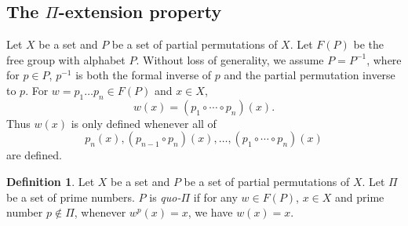 \documentclass[10pt,a4paper]{amsart}
\newtheorem{remark}[theorem]{Remark}
\theoremstyle{definition}
\newtheorem{definition}[theorem]{Definition}
\theoremstyle{definition}
\numberwithin{equation}{section}
\DeclareMathOperator{\Aut}{Aut}
\DeclareMathOperator{\Ker}{ker}
\begin{document}

\subsection{The $\Pi$-extension property}

Let $X$ be a set and $P$ be a set of partial permutations of $X$. Let $F(P)$ be the free group with alphabet $P$. Without loss of generality, we assume $P=P^{-1}$, where for $p\in P$, $p^{-1}$ is both the formal inverse of $p$ and the partial permutation inverse to $p$. For $w=p_1\dots p_n\in F(P)$ and $x\in X$, 
$$ w(x)=(p_1\circ \cdots \circ p_n)(x). $$
Thus $w(x)$ is only defined whenever all of $$p_n(x), (p_{n-1}\circ p_n)(x), \dots, (p_1\circ \cdots \circ p_n)(x)$$ are defined.

\begin{definition} Let $X$ be a set and $P$ be a set of partial permutations of $X$. Let $\Pi$ be a set of prime numbers. $P$ is {\em quo-$\Pi$} if for any $w\in F(P)$, $x\in X$ and prime number $p\not\in\Pi$, whenever $w^p(x)=x$, we have $w(x)=x$. 
\end{definition}
\end{document}
